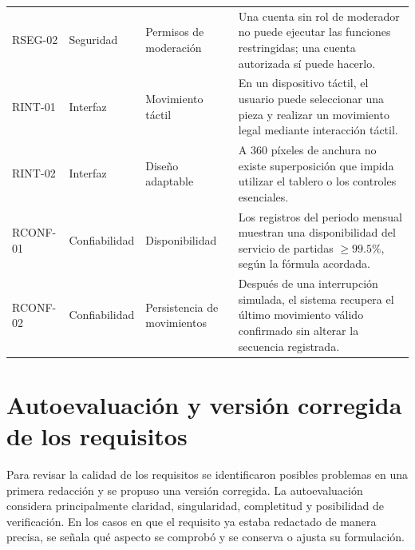 \documentclass[12pt,a4paper]{article}
\begin{document}
\begin{longtable}{p{1.35cm}p{2.35cm}p{5.1cm}p{6cm}}
RSEG-02 & Seguridad & Permisos de moderación & Una cuenta sin rol de moderador no puede ejecutar las funciones restringidas; una cuenta autorizada sí puede hacerlo.\\
RINT-01 & Interfaz & Movimiento táctil & En un dispositivo táctil, el usuario puede seleccionar una pieza y realizar un movimiento legal mediante interacción táctil.\\
RINT-02 & Interfaz & Diseño adaptable & A 360 píxeles de anchura no existe superposición que impida utilizar el tablero o los controles esenciales.\\
RCONF-01 & Confiabilidad & Disponibilidad & Los registros del periodo mensual muestran una disponibilidad del servicio de partidas $\geq 99.5\%$, según la fórmula acordada.\\
RCONF-02 & Confiabilidad & Persistencia de movimientos & Después de una interrupción simulada, el sistema recupera el último movimiento válido confirmado sin alterar la secuencia registrada.\\
\bottomrule
\end{longtable}
\normalsize

\newpage
\section{Autoevaluación y versión corregida de los requisitos}

Para revisar la calidad de los requisitos se identificaron posibles problemas en una primera redacción y se propuso una versión corregida. La autoevaluación considera principalmente claridad, singularidad, completitud y posibilidad de verificación. En los casos en que el requisito ya estaba redactado de manera precisa, se señala qué aspecto se comprobó y se conserva o ajusta su formulación.
\end{document}
